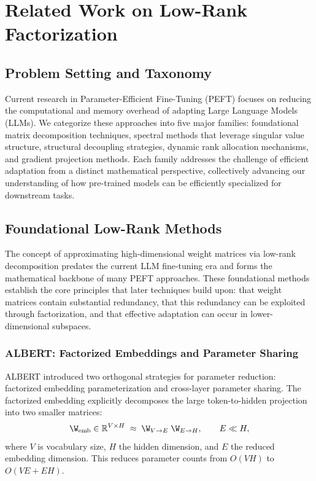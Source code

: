 

\section{Related Work on Low-Rank Factorization}
\label{sec:related_work}

\subsection{Problem Setting and Taxonomy}

Current research in Parameter-Efficient Fine-Tuning (PEFT) focuses on reducing the computational and memory overhead of adapting Large Language Models (LLMs). We categorize these approaches into five major families: foundational matrix decomposition techniques, spectral methods that leverage singular value structure, structural decoupling strategies, dynamic rank allocation mechanisms, and gradient projection methods. Each family addresses the challenge of efficient adaptation from a distinct mathematical perspective, collectively advancing our understanding of how pre-trained models can be efficiently specialized for downstream tasks.

\subsection{Foundational Low-Rank Methods}
\label{subsec:foundations}

The concept of approximating high-dimensional weight matrices via low-rank decomposition predates the current LLM fine-tuning era and forms the mathematical backbone of many PEFT approaches. These foundational methods establish the core principles that later techniques build upon: that weight matrices contain substantial redundancy, that this redundancy can be exploited through factorization, and that effective adaptation can occur in lower-dimensional subspaces.

\subsubsection{ALBERT: Factorized Embeddings and Parameter Sharing \cite{lan2019albert}}
\label{subsubsec:albert}

ALBERT introduced two orthogonal strategies for parameter reduction: factorized embedding parameterization and cross-layer parameter sharing. The factorized embedding explicitly decomposes the large token-to-hidden projection into two smaller matrices:
\begin{equation}
  \W_{\text{emb}} \in \mathbb{R}^{V \times H} \;\approx\; \W_{V\rightarrow E}\;\W_{E\rightarrow H}, \qquad E \ll H,
\end{equation}
where $V$ is vocabulary size, $H$ the hidden dimension, and $E$ the reduced embedding dimension. This reduces parameter counts from $O(VH)$ to $O(VE + EH)$.

